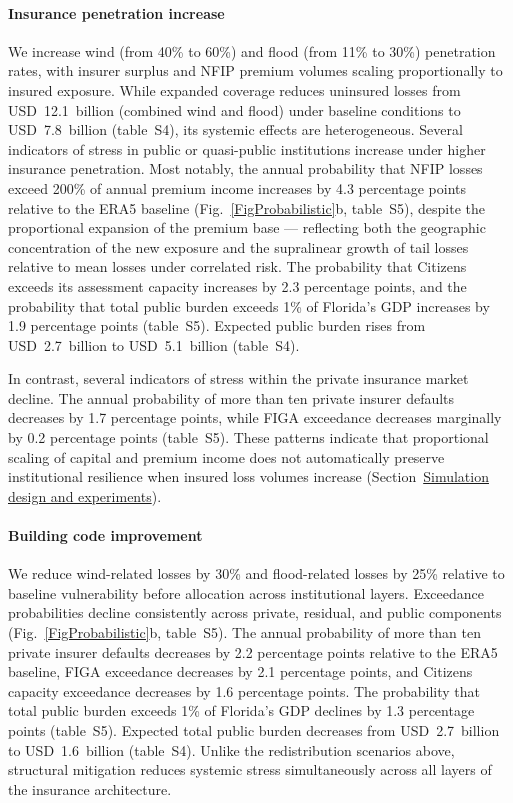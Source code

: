 \documentclass[fleqn,10pt]{wlscirep}
\newcommand{\SITabIV}{table~S4}
\newcommand{\SITabV}{table~S5}
\begin{document}
\paragraph{Insurance penetration increase}\label{ResPenetration}
We increase wind (from 40\% to 60\%) and flood (from 11\% to 30\%) penetration rates, with insurer surplus and NFIP premium volumes scaling proportionally to insured exposure.
While expanded coverage reduces uninsured losses from USD~12.1~billion (combined wind and flood) under baseline conditions to USD~7.8~billion (\SITabIV), its systemic effects are heterogeneous. Several indicators of stress in public or quasi-public institutions increase under higher insurance penetration. Most notably, the annual probability that NFIP losses exceed 200\% of annual premium income increases by 4.3 percentage points relative to the ERA5 baseline (Fig.~\ref{FigProbabilistic}b, \SITabV), despite the proportional expansion of the premium base --- reflecting both the geographic concentration of the new exposure and the supralinear growth of tail losses relative to mean losses under correlated risk. The probability that Citizens exceeds its assessment capacity increases by 2.3 percentage points, and the probability that total public burden exceeds 1\% of Florida's GDP increases by 1.9 percentage points (\SITabV). Expected public burden rises from USD~2.7~billion to USD~5.1~billion (\SITabIV).

In contrast, several indicators of stress within the private insurance market decline. The annual probability of more than ten private insurer defaults decreases by 1.7 percentage points, while FIGA exceedance decreases marginally by 0.2 percentage points (\SITabV). These patterns indicate that proportional scaling of capital and premium income does not automatically preserve institutional resilience when insured loss volumes increase (Section~\hyperref[MethodsPolicy]{Simulation design and experiments}). 

\paragraph{Building code improvement}
We reduce wind-related losses by 30\% and flood-related losses by 25\% relative to baseline vulnerability before allocation across institutional layers.
Exceedance probabilities decline consistently across private, residual, and public components (Fig.~\ref{FigProbabilistic}b, \SITabV). The annual probability of more than ten private insurer defaults decreases by 2.2 percentage points relative to the ERA5 baseline, FIGA exceedance decreases by 2.1 percentage points, and Citizens capacity exceedance decreases by 1.6 percentage points. The probability that total public burden exceeds 1\% of Florida's GDP declines by 1.3 percentage points (\SITabV). Expected total public burden decreases from USD~2.7~billion to USD~1.6~billion (\SITabIV). Unlike the redistribution scenarios above, structural mitigation reduces systemic stress simultaneously across all layers of the insurance architecture.
\medskip
\end{document}
